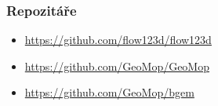 \documentclass[10pt, xcolor=dvipsnames]{beamer} %
\begin{document}
\begin{frame}
  \frametitle{Repozitáře}

  \begin{itemize}
    \setlength\itemsep{15pt}
    \item \url{https://github.com/flow123d/flow123d}
    \item \url{https://github.com/GeoMop/GeoMop}
    \item \url{https://github.com/GeoMop/bgem}
  \end{itemize}

\end{frame}
\end{document}
